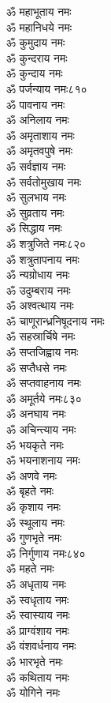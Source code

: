 \begin{multicols}{2}
\begin{flushleft}
ॐ महाभूताय नमः\\
ॐ महानिधये नमः\\
ॐ कुमुदाय नमः\\
ॐ कुन्दराय नमः\\
ॐ कुन्दाय नमः\\
ॐ पर्जन्याय नमः\hfill ८१०\\
ॐ पावनाय नमः\\
ॐ अनिलाय नमः\\
ॐ अमृताशाय नमः\\
ॐ अमृतवपुषे नमः\\
ॐ सर्वज्ञाय नमः\\
ॐ सर्वतोमुखाय नमः\\
ॐ सुलभाय नमः\\
ॐ सुव्रताय नमः\\
ॐ सिद्धाय नमः\\
ॐ शत्रुजिते नमः\hfill ८२०\\
ॐ शत्रुतापनाय नमः\\
ॐ न्यग्रोधाय नमः\\
ॐ उदुम्बराय नमः\\
ॐ अश्वत्थाय नमः\\
ॐ चाणूरान्ध्रनिषूदनाय नमः\\
ॐ सहस्रार्चिषे नमः\\
ॐ सप्तजिह्वाय नमः\\
ॐ सप्तैधसे नमः\\
ॐ सप्तवाहनाय नमः\\
ॐ अमूर्तये नमः\hfill ८३०\\
ॐ अनघाय नमः\\
ॐ अचिन्त्याय नमः\\
ॐ भयकृते नमः\\
ॐ भयनाशनाय नमः\\
ॐ अणवे नमः\\
ॐ बृहते नमः\\
ॐ कृशाय नमः\\
ॐ स्थूलाय नमः\\
ॐ गुणभृते नमः\\
ॐ निर्गुणाय नमः\hfill ८४०\\
ॐ महते नमः\\
ॐ अधृताय नमः\\
ॐ स्वधृताय नमः\\
ॐ स्वास्याय नमः\\
ॐ प्राग्वंशाय नमः\\
ॐ वंशवर्धनाय नमः\\
ॐ भारभृते नमः\\
ॐ कथिताय नमः\\
ॐ योगिने नमः\\

\end{flushleft}
\end{multicols}

